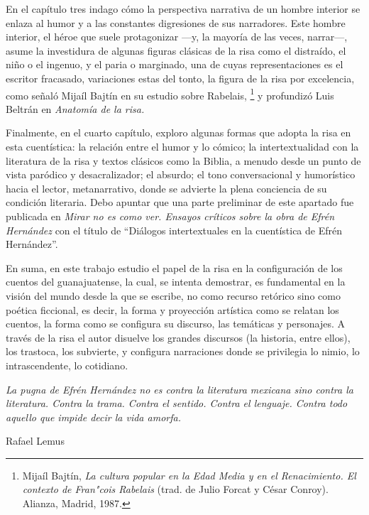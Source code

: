 \documentclass[14pt,twoside,final]{extbook} %
\let\oldfootnote\footnote
\renewcommand\footnote[1]{%
\oldfootnote{\hspace{1mm}#1}}
\begin{document}
En el capítulo tres indago cómo la perspectiva narrativa de un hombre interior se enlaza al humor y a las constantes digresiones de sus narradores. Este hombre interior, el héroe que suele protagonizar ---y, la mayoría de las veces, narrar---, asume la investidura de algunas figuras clásicas de la risa como el distraído, el niño o el ingenuo, y el paria o marginado, una de cuyas representaciones es el escritor fracasado, variaciones estas del tonto, la figura de la risa por excelencia, como señaló Mijaíl Bajtín en su estudio sobre Rabelais,\footnote{Mijaíl Bajtín, \emph{La cultura popular en la Edad Media y en el Renacimiento. El contexto de Fran"cois Rabelais} (trad. de Julio Forcat y César Conroy). Alianza, Madrid, 1987.} y profundizó Luis Beltrán en \emph{Anatomía de la risa.}

Finalmente, en el cuarto capítulo, exploro algunas formas que adopta la risa en esta cuentística: la relación entre el humor y lo cómico; la intertextualidad con la literatura de la risa y textos clásicos como la Biblia, a menudo desde un punto de vista paródico y desacralizador; el absurdo; el tono conversacional y humorístico hacia el lector, metanarrativo, donde se advierte la plena conciencia de su condición literaria. Debo apuntar que una parte preliminar de este apartado fue publicada en \emph{Mirar no es como ver. Ensayos críticos sobre la obra de Efrén Hernández} con el título de ``Diálogos intertextuales en la cuentística de Efrén Hernández''.

En suma, en este trabajo estudio el papel de la risa en la configuración de los cuentos del guanajuatense, la cual, se intenta demostrar, es fundamental en la visión del mundo desde la que se escribe, no como recurso retórico sino como poética ficcional, es decir, la forma y proyección artística como se relatan los cuentos, la forma como se configura su discurso, las temáticas y personajes. A través de la risa el autor disuelve los grandes discursos (la historia, entre ellos), los trastoca, los subvierte, y configura narraciones donde se privilegia lo nimio, lo intrascendente, lo cotidiano.
\cleardoublepage
\newpage
\pagestyle{empty}
\vspace*{42pt}
\begin{flushright}
\begin{minipage}{7.5cm}
\emph{La pugna de Efrén Hernández no es contra la literatura mexicana sino contra la literatura. Contra la trama. Contra el sentido. Contra el lenguaje. Contra todo aquello que impide decir la vida amorfa.}
\begin{flushright}
Rafael Lemus
\end{flushright}
\end{minipage}
\end{flushright}
\end{document}
